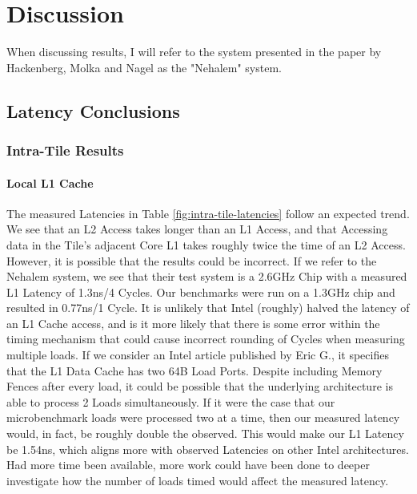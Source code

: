 \documentclass[bsc,frontabs,twoside,singlespacing,parskip,deptreport]{infthesis}     %
\begin{document}
\chapter{Discussion}\label{chap:discussion}
When discussing results, I will refer to the system presented in the paper by Hackenberg, Molka and Nagel\cite{cache-coherence-paper} as the "Nehalem" system.
\section{Latency Conclusions}
\subsection{Intra-Tile Results}
\subsubsection{Local L1 Cache}
The measured Latencies in Table \ref{fig:intra-tile-latencies} follow an expected trend. We see that an L2 Access takes longer than an L1 Access, and that Accessing data in the Tile's adjacent Core L1 takes roughly twice the time of an L2 Access. However, it is possible that the results could be incorrect. If we refer to the Nehalem system, we see that their test system is a 2.6GHz Chip with a measured L1 Latency of 1.3ns/4 Cycles. Our benchmarks were run on a 1.3GHz chip and resulted in 0.77ns/1 Cycle. It is unlikely that Intel (roughly) halved the latency of an L1 Cache access, and is it more likely that there is some error within the timing mechanism that could cause incorrect rounding of Cycles when measuring multiple loads. If we consider an Intel article published by Eric G.\cite{eric-intel-article}, it specifies that the L1 Data Cache has two 64B Load Ports. Despite including Memory Fences after every load, it could be possible that the underlying architecture is able to process 2 Loads simultaneously. If it were the case that our microbenchmark loads were processed two at a time, then our measured latency would, in fact, be roughly double the observed. This would make our L1 Latency be 1.54ns, which aligns more with observed Latencies on other Intel architectures. Had more time been available, more work could have been done to deeper investigate how the number of loads timed would affect the measured latency.
\end{document}
